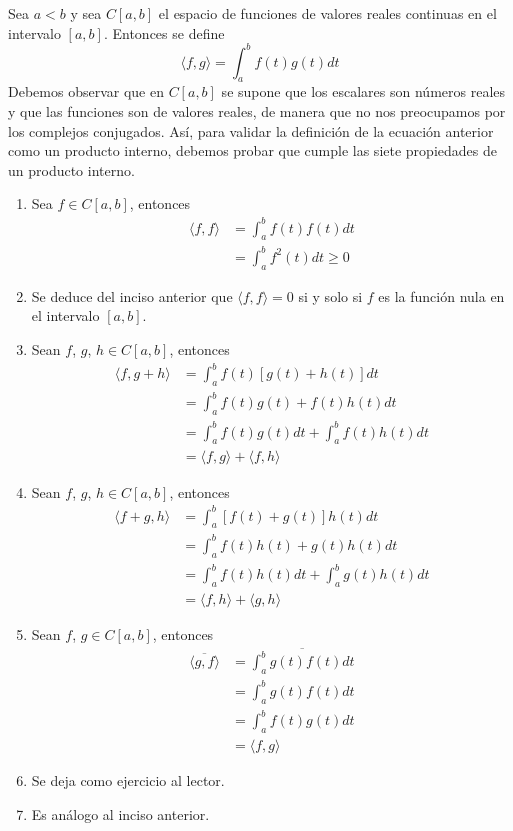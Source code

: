 \begin{example}\label{interno_funciones}
    Sea $a < b$ y sea $C[a, b]$ el espacio de funciones de valores reales continuas en el intervalo $[a, b]$. Entonces se define
    $$\langle f, g \rangle = \int_a^b f(t) g(t) dt$$
    Debemos observar que en $C[a, b]$ se supone que los escalares son números reales y que las funciones son de valores reales, de manera que no nos preocupamos por los complejos conjugados. Así, para validar la definición de la ecuación anterior como un producto interno, debemos probar que cumple las siete propiedades de un producto interno.
    \begin{enumerate}[label=\roman*)]
        \item Sea $f \in C[a, b]$, entonces
        \begin{align*}
            \langle f, f \rangle & = \int_a^b f(t) f(t) dt \\
            & = \int_a^b f^2(t) dt \geq 0
        \end{align*}
        \item Se deduce del inciso anterior que $\langle f, f \rangle = 0$ si y solo si $f$ es la función nula en el intervalo $[a, b]$.
        \item Sean $f$, $g$, $h \in C[a, b]$, entonces
        \begin{align*}
            \langle f, g + h \rangle & = \int_a^b f(t) [g(t) + h(t)] dt \\
            & = \int_a^b f(t) g(t) + f(t)h(t) dt \\
            & = \int_a^b f(t) g(t) dt + \int_a^b f(t)h(t) dt \\
            & = \langle f, g \rangle + \langle f, h \rangle
        \end{align*}
        \item Sean $f$, $g$, $h \in C[a, b]$, entonces
        \begin{align*}
            \langle f + g, h \rangle & = \int_a^b [f(t) + g(t)] h(t) dt \\
            & = \int_a^b f(t)h(t) + g(t)h(t) dt \\
            & = \int_a^b f(t)h(t) dt + \int_a^b g(t)h(t) dt \\
            & = \langle f, h \rangle + \langle g, h \rangle
        \end{align*}
        \item Sean $f$, $g \in C[a, b]$, entonces
        \begin{align*}
            \overline{\langle g, f \rangle} & = \overline{\int_a^b g(t)f(t) dt} \\
            & = \int_a^b g(t)f(t) dt \\
            & = \int_a^b f(t)g(t) dt \\
            & = \langle f, g \rangle
        \end{align*}
        \item Se deja como ejercicio al lector.
        \item Es análogo al inciso anterior.
    \end{enumerate}
\end{example}

